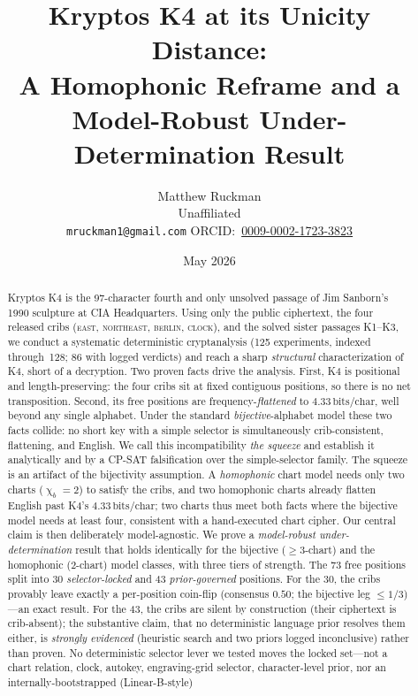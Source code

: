 \documentclass[11pt]{article}
\title{\textbf{Kryptos K4 at its Unicity Distance:\\
A Homophonic Reframe and a Model-Robust Under-Determination Result}}
\author{Matthew Ruckman \\ Unaffiliated \\
  \texttt{mruckman1@gmail.com} \quad ORCID:~\href{https://orcid.org/0009-0002-1723-3823}{0009-0002-1723-3823}}
\date{May 2026}
\theoremstyle{plain}
\theoremstyle{definition}
\newcommand{\K}{\textsf{K4}}
\newcommand{\bits}{\,\text{bits/char}}
\DeclareMathOperator{\chrom}{\chi}
\begin{document}
\maketitle

\begin{abstract}
\noindent
Kryptos K4 is the 97-character fourth and only unsolved passage of Jim Sanborn's
1990 sculpture at CIA Headquarters. Using only the public ciphertext, the four
released cribs (\textsc{east}, \textsc{northeast}, \textsc{berlin}, \textsc{clock}),
and the solved sister passages K1--K3, we conduct a systematic deterministic
cryptanalysis (125 experiments, indexed through~128; 86 with logged verdicts) and
reach a sharp \emph{structural} characterization of \K{}, short of a decryption.
Two proven facts drive the analysis. First, \K{} is positional and
length-preserving: the four cribs sit at fixed contiguous positions, so there is no
net transposition. Second, its free positions are frequency-\emph{flattened} to
$4.33\bits$, well beyond any single alphabet. Under the standard
\emph{bijective}-alphabet model these two facts collide: no short key with a simple
selector is simultaneously crib-consistent, flattening, and English. We call this
incompatibility \emph{the squeeze} and establish it analytically and by a CP-SAT
falsification over the simple-selector family. The squeeze is an artifact of the
bijectivity assumption. A \emph{homophonic} chart model needs only two charts
($\chrom_b{=}2$) to satisfy the cribs, and two homophonic charts already flatten
English past \K{}'s $4.33\bits$; two charts thus meet both facts where the bijective
model needs at least four, consistent with a hand-executed chart cipher. Our central
claim is then deliberately model-agnostic. We prove a \emph{model-robust
under-determination} result that holds identically for the bijective ($\ge3$-chart)
and the homophonic ($2$-chart) model classes, with three tiers of strength. The 73 free positions split into 30
\emph{selector-locked} and 43 \emph{prior-governed} positions. For the 30, the cribs
provably leave exactly a per-position coin-flip (consensus $0.50$; the bijective leg
$\le1/3$)---an exact result. For the 43, the cribs are silent by construction (their
ciphertext is crib-absent); the substantive claim, that no deterministic language
prior resolves them either, is \emph{strongly evidenced} (heuristic search and two
priors logged inconclusive) rather than proven. No deterministic selector lever we
tested moves the locked set---not a chart relation, clock, autokey, engraving-grid
selector, character-level prior, nor an internally-bootstrapped (Linear-B-style)

\end{abstract}
\end{document}
